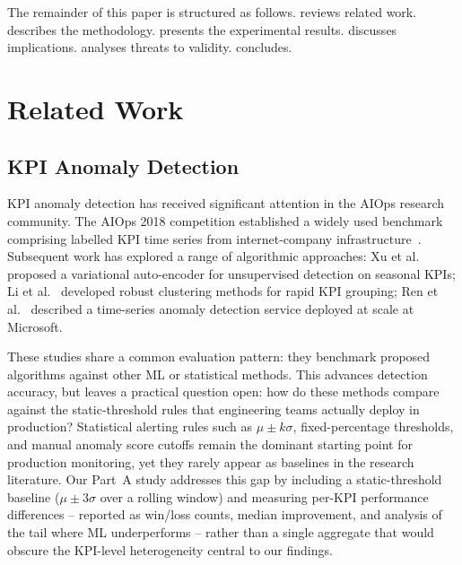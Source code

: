 \documentclass[10pt,twocolumn]{article}
\begin{document}
The remainder of this paper is structured as follows.  reviews related work.  describes the methodology.  presents the experimental results.  discusses implications.  analyses threats to validity.  concludes.

\section{Related Work}
\label{sec:related}

\subsection{KPI Anomaly Detection}

KPI anomaly detection has received significant attention in the AIOps research community. The AIOps 2018 competition established a widely used benchmark comprising labelled KPI time series from internet-company infrastructure~\cite{aiops2018}. Subsequent work has explored a range of algorithmic approaches: Xu et al.~\cite{xu2018} proposed a variational auto-encoder for unsupervised detection on seasonal KPIs; Li et al.~\cite{li2018clustering} developed robust clustering methods for rapid KPI grouping; Ren et al.~\cite{ren2019} described a time-series anomaly detection service deployed at scale at Microsoft.

These studies share a common evaluation pattern: they benchmark proposed algorithms against other ML or statistical methods. This advances detection accuracy, but leaves a practical question open: how do these methods compare against the static-threshold rules that engineering teams actually deploy in production? Statistical alerting rules such as $\mu \pm k\sigma$, fixed-percentage thresholds, and manual anomaly score cutoffs remain the dominant starting point for production monitoring, yet they rarely appear as baselines in the research literature. Our Part~A study addresses this gap by including a static-threshold baseline ($\mu \pm 3\sigma$ over a rolling window) and measuring per-KPI performance differences -- reported as win/loss counts, median improvement, and analysis of the tail where ML underperforms -- rather than a single aggregate that would obscure the KPI-level heterogeneity central to our findings.
\end{document}
